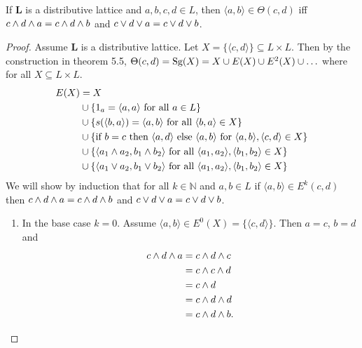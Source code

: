 \begin{theorem*}
  If $\mathbf{L}$ is a distributive lattice and $a, b, c, d \in L$, then $\langle a, b \rangle \in \Theta(c, d)$ iff $c \wedge d \wedge a = c \wedge d \wedge b$ and $c \vee d \vee a = c \vee d \vee b$.
\end{theorem*}

\begin{proof}
  Assume $\mathbf{L}$ is a distributive lattice.
  Let $X = \{\langle c, d \rangle\} \subseteq L\times L$.
  Then by the construction in theorem 5.5, $\Theta(c, d) = \text{Sg}(X) = X \cup E(X) \cup E^2(X) \cup \ldots$ where for all $X\subseteq L\times L$.
  \begin{align*}
    E(X) &= X \\
         &\cup \{ 1_a = \langle a, a \rangle \text{ for all } a \in L\} \\
         &\cup \{ s(\langle b, a \rangle) = \langle a, b \rangle \text{ for all } \langle b, a \rangle \in  X \} \\
         &\cup \{ \text{if } b = c \text{ then } \langle a, d \rangle \text{ else } \langle a, b\rangle \text{ for }  \langle a, b\rangle, \langle c, d \rangle \in X \} \\
         &\cup \{\langle a_1 \wedge a_2, b_1 \wedge b_2 \rangle \text{ for all } \langle a_1, a_2\rangle, \langle b_1, b_2\rangle \in X \} \\
         &\cup \{\langle a_1 \vee a_2, b_1 \vee b_2 \rangle \text{ for all } \langle a_1, a_2\rangle, \langle b_1, b_2\rangle \in X \} 
  \end{align*}
  We will show by induction that for all $k \in \mathbb{N}$ and $a, b \in L$ if $\langle a, b \rangle \in E^{k}(c, d)$ then $c \wedge d \wedge a = c \wedge d \wedge b$ and $c \vee d \vee a = c \vee d \vee b$.
  \begin{enumerate}
  \item
    In the base case $k = 0$.
    Assume $\langle a, b \rangle \in E^0(X) = \{ \langle c, d \rangle \}$.
    Then $a = c$, $b = d$ and
    \begin{align*}
      c \wedge d \wedge a &= c \wedge d \wedge c \\
                        &= c \wedge c \wedge d \\
                        &= c \wedge d \\
                        &= c \wedge d \wedge d \\
                        &= c \wedge d \wedge b.
    \end{align*}

\end{enumerate}
\end{proof}
